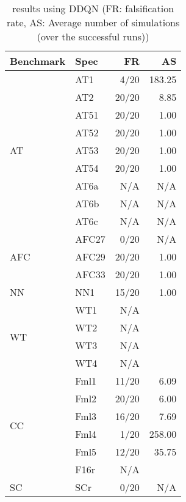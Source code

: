	\begin{table}[!tb]
		\centering
		\caption{\falsify results using DDQN (FR: falsification rate, AS: Average number of simulations (over the successful  runs))}
		\label{table:falsifyDDQNResults}
		\begin{tabular}{llrr}
			\toprule
			Benchmark & Spec & FR & AS\\
			\midrule
			\multirow{9}{*}{AT}
			& AT1 & 4/20 & 183.25\\
			& AT2 & 20/20 & 8.85\\
			& AT51 & 20/20 & 1.00\\
			& AT52 & 20/20 & 1.00\\
			& AT53 & 20/20 & 1.00\\
			& AT54 & 20/20 & 1.00\\
			& AT6a & N/A & N/A\\
			& AT6b & N/A & N/A\\
			& AT6c & N/A & N/A\\
			\hline
			\multirow{3}{*}{AFC}
			& AFC27 & 0/20 & N/A\\
			& AFC29 & 20/20 & 1.00\\
			& AFC33 & 20/20 & 1.00\\
			\hline
			NN & NN1 & 15/20 & 1.00\\
			\hline
			\multirow{4}{*}{WT}
			& WT1 & N/A\\
			& WT2 & N/A\\
			& WT3 & N/A\\
			& WT4 & N/A\\
			\hline
			\multirow{6}{*}{CC}
			& Fml1 & 11/20 & 6.09\\
			& Fml2 & 20/20 & 6.00\\
			& Fml3 & 16/20 & 7.69\\
			& Fml4 & 1/20 & 258.00\\
			& Fml5 & 12/20 & 35.75\\
			\hline
			F16 & F16r & N/A\\
			\hline
			SC & SCr & 0/20 & N/A\\
			\bottomrule
		\end{tabular}
	\end{table}

